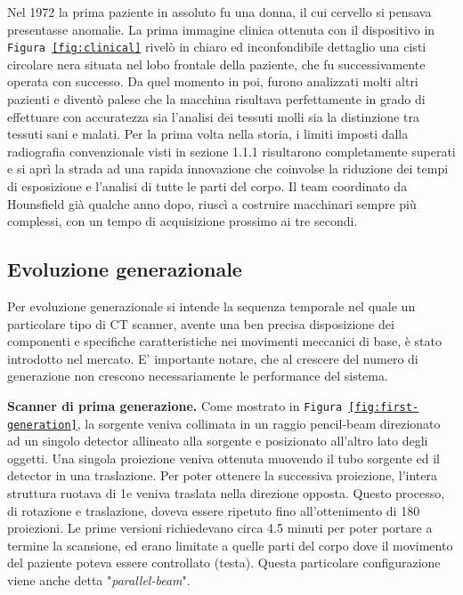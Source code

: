 \documentclass[a4paper,12pt, doubleside]{report}
\begin{document}
                    Nel 1972 la prima paziente in assoluto fu una donna, il cui cervello si pensava presentasse anomalie. La prima immagine clinica ottenuta con il dispositivo in \texttt{Figura \ref{fig:clinical}} rivelò in chiaro ed inconfondibile dettaglio una cisti circolare nera situata nel lobo frontale della paziente, che fu successivamente operata con successo. Da quel momento in poi, furono analizzati molti altri pazienti e diventò palese che la macchina risultava perfettamente in grado di effettuare con accuratezza sia l'analisi dei tessuti molli sia la distinzione tra tessuti sani e malati\cite{hounsfield-nobel-lecture}.
                    Per la prima volta nella storia, i limiti imposti dalla radiografia convenzionale visti in sezione 1.1.1 risultarono completamente superati e si aprì la strada ad una rapida innovazione che coinvolse la riduzione dei tempi di esposizione e l'analisi di tutte le parti del corpo. Il team coordinato da Hounsfield già qualche anno dopo, riuscì a costruire macchinari sempre più complessi, con un tempo di acquisizione prossimo ai tre secondi.
                            
            \subsection{Evoluzione generazionale}
                \par
                    Per evoluzione generazionale si intende la sequenza temporale nel quale un particolare tipo di CT scanner, avente una ben precisa disposizione dei componenti e specifiche caratteristiche nei movimenti meccanici di base, è stato introdotto nel mercato. E’ importante notare, che al crescere del numero di generazione non crescono necessariamente le performance del sistema.
                        
                \bigskip
                \par
                    \textbf{Scanner di prima generazione.} Come mostrato in \texttt{Figura \ref{fig:first-generation}}, la sorgente veniva collimata in un raggio pencil-beam direzionato ad un singolo detector allineato alla sorgente e posizionato all’altro lato degli oggetti. Una singola proiezione veniva ottenuta muovendo il tubo sorgente ed il detector in una traslazione. Per poter ottenere la successiva proiezione, l’intera struttura ruotava di 1\degree e veniva traslata nella direzione opposta. Questo processo, di rotazione e traslazione, doveva essere ripetuto fino all’ottenimento di 180 proiezioni. Le prime versioni richiedevano circa 4.5 minuti per poter portare a termine la scansione, ed erano limitate a quelle parti del corpo dove il movimento del paziente poteva essere controllato (testa). Questa particolare configurazione viene anche detta "\textit{parallel-beam}".
                            
\end{document}
